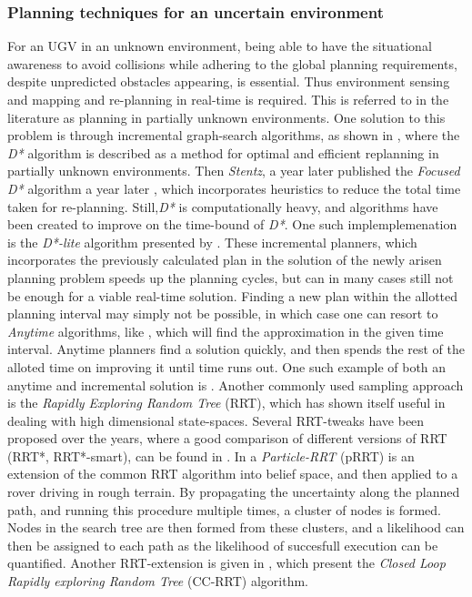 \subsubsection{Planning techniques for an uncertain environment}
For an UGV in an unknown environment, being able to have the situational
awareness to avoid collisions while adhering to the global planning
requirements, despite unpredicted obstacles appearing, is essential. Thus
environment sensing and mapping and re-planning in real-time is required. This
is referred to in the literature as planning in partially unknown environments.
One solution to this problem is through incremental graph-search algorithms, as
shown in \cite[Stentz]{stentzOptimalEfficientPath}, where the \textsl{D*}
algorithm is described as a method for optimal and efficient replanning in
partially unknown environments. Then \textit{Stentz}, a year later published the
\textit{Focused D*} algorithm a year later \cite{stentz1995focussed}, which
incorporates heuristics to reduce the total time taken for re-planning.
Still,\textit{D*} is computationally heavy, and algorithms have been created to
improve on the time-bound of \textit{D*}. One such implemplemenation is the
\textit{D*-lite} algorithm presented by \cite[Koenig]{koenig2002d}. These
incremental planners, which incorporates the previously calculated plan in the
solution of the newly arisen planning problem speeds up the planning cycles, but
can in many cases still not be enough for a viable real-time solution. Finding a
new plan within the allotted planning interval may simply not be possible, in
which case one can resort to \textit{Anytime} algorithms, like \cite[Karaman et.
al]{karamanAnytimeMotionPlanning2011}, which will find the approximation in the
given time interval. Anytime planners find a solution quickly, and then spends
the rest of the alloted time on improving it until time runs out. One such
example of both an anytime and incremental solution is
\cite[Likachev]{likhachevAnytimeSearchDynamic2008}. Another commonly used
sampling approach is the \textit{Rapidly Exploring Random Tree} (RRT), which has
shown itself useful in dealing with high dimensional state-spaces. Several
RRT-tweaks have been proposed over the years, where a good comparison of
different versions of RRT (RRT*, RRT*-smart), can be found in
\cite{noreenComparisonRRTRRT2016}. In \cite{melchiorParticleRRTPath2007} a
\textit{Particle-RRT} (pRRT) is an extension of the common RRT algorithm into
belief space, and then applied to a rover driving in rough terrain. By
propagating the uncertainty along the planned path, and running this procedure
multiple times, a cluster of nodes is formed. Nodes in the search tree are then
formed from these clusters, and a likelihood can then be assigned to each path
as the likelihood of succesfull execution can be quantified. Another
RRT-extension is given in \cite{Luders_2013}, which present the \textit{Closed
  Loop Rapidly exploring Random Tree} (CC-RRT) algorithm.


